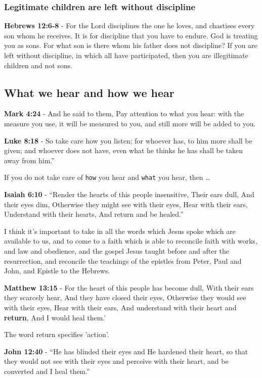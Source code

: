 \documentclass[11pt]{article}
\begin{document}
\subsubsection{Legitimate children are left without discipline}
\label{sec:org9ce4e43}
\textbf{Hebrews 12:6-8} - For the Lord disciplines the one he loves, and chastises every son whom he receives. It is for discipline that you have to endure. God is treating you as sons. For what son is there whom his father does not discipline? If you are left without discipline, in which all have participated, then you are illegitimate children and not sons.

\subsection{What we hear and how we hear}
\label{sec:org118d475}
\textbf{Mark 4:24} - And he said to them, Pay attention to what you hear: with the measure you use, it will be measured to you, and still more will be added to you.

\textbf{Luke 8:18} - So take care how you listen; for whoever has, to him more shall be given; and whoever does not have, even what he thinks he has shall be taken away from him.”

If you do not take care of \texttt{how} you hear and \texttt{what} you hear, then \ldots{}

\textbf{Isaiah 6:10} - “Render the hearts of this people insensitive, Their ears dull, And their eyes dim, Otherwise they might see with their eyes, Hear with their ears, Understand with their hearts, And return and be healed.”

I think it's important to take in all the words which Jesus spoke which are available to us, and to come to a faith which is able to reconcile faith with works, and law and obedience, and the gospel Jesus taught before and after the resurrection, and reconcile the teachings of the epistles from Peter, Paul and John, and Epistle to the Hebrews.

\textbf{Matthew 13:15} - For the heart of this people has become dull, With their ears they scarcely hear, And they have closed their eyes, Otherwise they would see with their eyes, Hear with their ears, And understand with their heart and \textbf{return}, And I would heal them.’

The word return specifies 'action'.

\textbf{John 12:40} - “He has blinded their eyes and He hardened their heart, so that they would not see with their eyes and perceive with their heart, and be converted and I heal them.”
\end{document}
